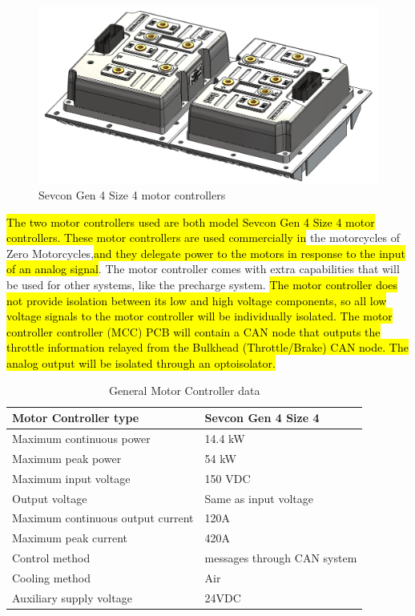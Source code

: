 \documentclass{article}
\DeclareRobustCommand{\hlr}[1]{{\sethlcolor{red}\hl{#1}}}
\begin{document}

            \begin{figure}[H]
                \centering
                \includegraphics[width = 0.7 \textwidth]{motorcontrollers_separate}
                \caption{Sevcon Gen 4 Size 4 motor controllers}
                \label{mcoffcar}
            \end{figure}

            \hlr{The two motor controllers used are both model Sevcon Gen 4 Size 4 motor controllers. These motor controllers are used commercially in} the motorcycles of Zero Motorcycles,\hlr{and they delegate power to the motors in response to the input of an analog signal}. The motor controller comes with extra capabilities that will be used for other systems, like the precharge system. \hlr{The motor controller does not provide isolation between its low and high voltage components, so all low voltage signals to the motor controller will be individually isolated. The motor controller controller (MCC) PCB will contain a CAN node that outputs the throttle information relayed from the Bulkhead (Throttle/Brake) CAN node. The analog output will be isolated through an optoisolator.}

            \begin{table}[H]
            \centering
            \begin{tabular}{|l|l|}
            \hline
            Motor Controller type & Sevcon Gen 4 Size 4 \\ \hline
            Maximum continuous power & 14.4 kW \\ \hline
            Maximum peak power & 54 kW \\ \hline
            Maximum input voltage & 150 VDC \\ \hline
            Output voltage & Same as input voltage \\ \hline
            Maximum continuous output current & 120A \\ \hline
            Maximum peak current & 420A \\ \hline
            Control method & messages through CAN system \\ \hline
            Cooling method & Air \\ \hline
            Auxiliary supply voltage & 24VDC \\ \hline
            \end{tabular}
            \caption{General Motor Controller data}
            \label{MC}
            \end{table}
\end{document}

